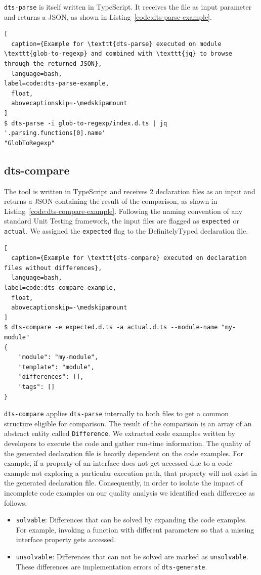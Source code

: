 \documentclass[a4paper,english,cleveref, autoref]{lipics-v2019}
\newcommand{\coderef}[1]{Listing~\ref{#1}}
\begin{document}
\texttt{dts-parse} is itself written in TypeScript. It receives the file as input parameter and returns a JSON, as shown in \coderef{code:dts-parse-example}.

\begin{lstlisting}[
  caption={Example for \texttt{dts-parse} executed on module \texttt{glob-to-regexp} and combined with \texttt{jq} to browse through the returned JSON},
  language=bash,
label=code:dts-parse-example,
  float,
  abovecaptionskip=-\medskipamount
]
$ dts-parse -i glob-to-regexp/index.d.ts | jq '.parsing.functions[0].name'
"GlobToRegexp"
\end{lstlisting}

\subsection{dts-compare}
\label{sec:dts-compare}
The tool is written in TypeScript and receives 2 declaration files as an input and returns a JSON containing the result of the comparison, as shown in \coderef{code:dts-compare-example}. Following the naming convention of any standard Unit Testing framework, the input files are flagged as \lstinline{expected} or \lstinline{actual}. We assigned the \lstinline{expected} flag to the DefinitelyTyped declaration file.

\begin{lstlisting}[
  caption={Example for \texttt{dts-compare} executed on declaration files without differences},
  language=bash,
label=code:dts-compare-example,
  float,
  abovecaptionskip=-\medskipamount
]
$ dts-compare -e expected.d.ts -a actual.d.ts --module-name "my-module"
{
    "module": "my-module",
    "template": "module",
    "differences": [],
    "tags": []
}
\end{lstlisting}

\texttt{dts-compare} applies \texttt{dts-parse} internally to both files to get a common structure eligible for comparison. The result of the comparison is an array of an abstract entity called \texttt{Difference}. We extracted code examples written by developers to execute the code and gather run-time information. The quality of the generated declaration file is heavily dependent on the code examples. For example, if a property of an interface does not get accessed due to a code example not exploring a particular execution path, that property will not exist in the generated declaration file. Consequently, in order to isolate the impact of incomplete code examples on our quality analysis we identified each difference as follows:
\begin{itemize}
  \item \texttt{solvable}: Differences that can be solved by expanding the code examples. For example, invoking a function with different parameters so that a missing interface property gets accessed.
  \item \texttt{unsolvable}: Differences that can not be solved are marked as \texttt{unsolvable}. These differences are implementation errors of \texttt{dts-generate}.
\end{itemize}
\end{document}
